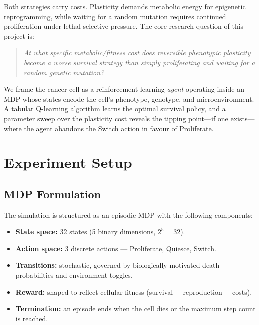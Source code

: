 \documentclass[12pt,a4paper]{article}
\begin{document}
Both strategies carry costs. Plasticity demands metabolic energy for epigenetic reprogramming, while waiting for a random mutation requires continued proliferation under lethal selective pressure. The core research question of this project is:

\begin{quote}
    \emph{At what specific metabolic/fitness cost does reversible phenotypic plasticity become a worse survival strategy than simply proliferating and waiting for a random genetic mutation?}
\end{quote}

We frame the cancer cell as a reinforcement-learning \emph{agent} operating inside an MDP whose states encode the cell's phenotype, genotype, and microenvironment. A tabular Q-learning algorithm learns the optimal survival policy, and a parameter sweep over the plasticity cost reveals the tipping point---if one exists---where the agent abandons the Switch action in favour of Proliferate.

\section{Experiment Setup}

\subsection{MDP Formulation}

The simulation is structured as an episodic MDP with the following components:

\begin{itemize}[nosep]
    \item \textbf{State space:} 32 states (5 binary dimensions, $2^5 = 32$).
    \item \textbf{Action space:} 3 discrete actions --- Proliferate, Quiesce, Switch.
    \item \textbf{Transitions:} stochastic, governed by biologically-motivated death probabilities and environment toggles.
    \item \textbf{Reward:} shaped to reflect cellular fitness (survival $+$ reproduction $-$ costs).
    \item \textbf{Termination:} an episode ends when the cell dies or the maximum step count is reached.
\end{itemize}
\end{document}
